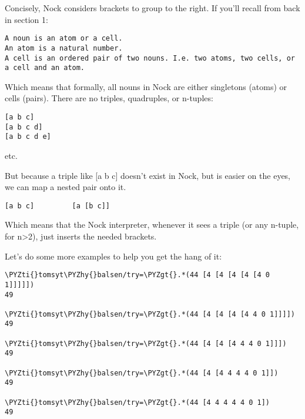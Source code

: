 Concisely, Nock considers brackets to group to the right. If you'll recall from back in section 1:
\begin{framed_shaded}
\begin{Verbatim}[fontsize=\relsize{-2.5},fontseries=b,commandchars=\\\{\}]
A noun is an atom or a cell.
An atom is a natural number.
A cell is an ordered pair of two nouns. I.e. two atoms, two cells, or a cell and an atom.
\end{Verbatim}
\end{framed_shaded}
Which means that formally, all nouns in Nock are either singletons (atoms) or
cells (pairs). There are no triples, quadruples, or n-tuples:
\begin{framed_shaded}
\begin{Verbatim}[fontsize=\relsize{-2.5},fontseries=b,commandchars=\\\{\}]
[a b c]
[a b c d]
[a b c d e]
\end{Verbatim}
\end{framed_shaded}
etc.

But because a triple like [a b c] doesn't exist in Nock, but is easier on the
eyes, we can map a nested pair onto it.
\begin{framed_shaded}
\begin{Verbatim}[fontsize=\relsize{-2.5},fontseries=b,commandchars=\\\{\}]
[a b c]         [a [b c]]
\end{Verbatim}
\end{framed_shaded}
Which means that the Nock interpreter, whenever it sees a triple (or any
n-tuple, for n\textgreater{}2), just inserts the needed brackets.

Let's do some more examples to help you get the hang of it:
\begin{framed_shaded}
\begin{Verbatim}[fontsize=\relsize{-2.5},fontseries=b,commandchars=\\\{\}]
\PYZti{}tomsyt\PYZhy{}balsen/try=\PYZgt{}.*(44 [4 [4 [4 [4 [4 0 1]]]]])
49

\PYZti{}tomsyt\PYZhy{}balsen/try=\PYZgt{}.*(44 [4 [4 [4 [4 4 0 1]]]])
49

\PYZti{}tomsyt\PYZhy{}balsen/try=\PYZgt{}.*(44 [4 [4 [4 4 4 0 1]]])
49

\PYZti{}tomsyt\PYZhy{}balsen/try=\PYZgt{}.*(44 [4 [4 4 4 4 0 1]])
49

\PYZti{}tomsyt\PYZhy{}balsen/try=\PYZgt{}.*(44 [4 4 4 4 4 0 1])
49
\end{Verbatim}
\end{framed_shaded}

